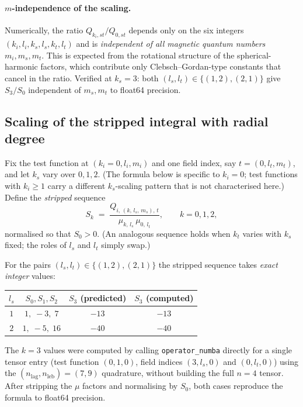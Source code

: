 \documentclass{article}
\begin{document}
\paragraph{$m$-independence of the scaling.}
Numerically, the ratio $Q_{k_i,st}/Q_{0,st}$ depends only on the six
integers $(k_i,l_i,k_s,l_s,k_t,l_t)$ and is \emph{independent of all
magnetic quantum numbers} $m_i,m_s,m_t$.
This is expected from the rotational structure of the spherical-harmonic
factors, which contribute only Clebsch--Gordan-type constants that cancel
in the ratio.
Verified at $k_s=3$: both $(l_s,l_t)\in\{(1,2),(2,1)\}$ give $S_3/S_0$
independent of $m_s,m_t$ to float64 precision.

\subsection*{Scaling of the stripped integral with radial degree}

Fix the test function at $(k_i = 0, l_i, m_i)$ and one field index, say
$t = (0, l_t, m_t)$, and let $k_s$ vary over $0, 1, 2$.
(The formula below is specific to $k_i = 0$; test functions with $k_i \geq 1$
carry a different $k_s$-scaling pattern that is not characterised here.)
Define the \emph{stripped} sequence
\[
  S_k \;=\; \frac{Q_{i,\,(k,\,l_s,\,m_s),\,t}}
               {\mu_{k,\,l_s}\,\mu_{0,\,l_t}},
\qquad k = 0,1,2,
\]
normalised so that $S_0 > 0$.  (An analogous sequence holds when $k_t$
varies with $k_s$ fixed; the roles of $l_s$ and $l_t$ simply swap.)

For the pairs $(l_s, l_t) \in \{(1,2),(2,1)\}$ the stripped sequence takes
\emph{exact integer} values:

\begin{center}
\begin{tabular}{cccc}
\hline
$l_s$ & $S_0, S_1, S_2$ & $S_3$ (predicted) & $S_3$ (computed) \\
\hline
$1$ & $1,\;-3,\;7$ & $-13$ & $-13$ \\
$2$ & $1,\;-5,\;16$ & $-40$ & $-40$ \\
\hline
\end{tabular}
\end{center}
The $k=3$ values were computed by calling \texttt{operator\_numba} directly
for a single tensor entry (test function $(0,1,0)$, field indices
$(3,l_s,0)$ and $(0,l_t,0)$) using the $(n_\mathrm{lag},n_\mathrm{leb})=(7,9)$
quadrature, without building the full $n=4$ tensor.
After stripping the $\mu$ factors and normalising by $S_0$, both cases
reproduce the formula to float64 precision.
\end{document}
